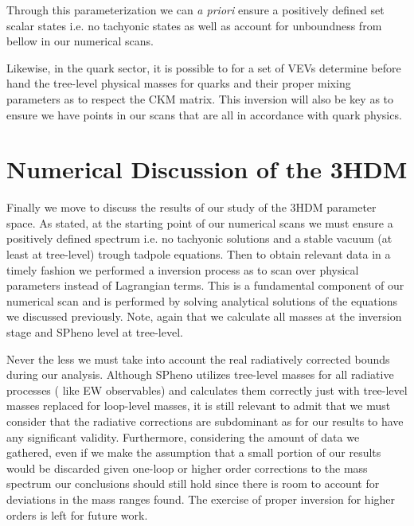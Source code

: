Through this parameterization we can \textit{a priori} ensure a positively defined set scalar states i.e. no tachyonic states as well as account for unboundness from bellow in our numerical scans. 

Likewise, in the quark sector, it is possible to for a set of VEVs determine before hand the tree-level physical masses for quarks and their proper mixing parameters as to respect the CKM matrix. 
%
This inversion will also be key as to ensure we have points in our scans that are all in accordance with quark physics. 

\section{Numerical Discussion of the 3HDM} 

Finally we move to discuss the results of our study of the 3HDM parameter space.
%
%
As stated, at the starting point of our numerical scans we must ensure a positively defined spectrum i.e. no tachyonic solutions and a stable vacuum (at least at tree-level) trough tadpole equations. %
% 
% 
Then to obtain relevant data in a timely fashion we performed a inversion process as to scan over physical parameters instead of Lagrangian terms.  
% 
This is a fundamental component of our numerical scan and is performed by solving analytical solutions of the equations we discussed previously. 
%
%
Note, again that we calculate all masses at the inversion stage and SPheno level at tree-level.  

Never the less we must take into account the real radiatively corrected bounds during our analysis. 
%
Although SPheno utilizes tree-level masses for all radiative processes ( like EW observables) and calculates them correctly just with tree-level masses replaced for loop-level masses, it is still relevant to admit that we must consider that the radiative corrections are subdominant as for our results to have any significant validity.
%
Furthermore, considering the amount of data we gathered, even if we make the assumption that a small portion of our results would be discarded given one-loop or higher order corrections to the mass spectrum our conclusions should still hold since there is room to account for deviations in the mass ranges found.
% 
The exercise of proper inversion for higher orders is left for future work.

